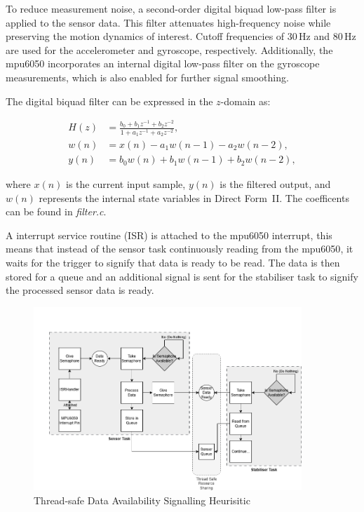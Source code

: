 To reduce measurement noise, a second-order digital biquad low-pass filter is applied to the sensor data. This filter attenuates high-frequency noise while preserving the motion dynamics of interest. Cutoff frequencies of 30\,Hz and 80\,Hz are used for the accelerometer and gyroscope, respectively. Additionally, the \gls{mpu6050} incorporates an internal digital low-pass filter on the gyroscope measurements, which is also enabled for further signal smoothing.

The digital biquad filter can be expressed in the $z$-domain as:

\begin{align}
H(z) &= \frac{b_0 + b_1 z^{-1} + b_2 z^{-2}}{1 + a_1 z^{-1} + a_2 z^{-2}}, \\[6pt]
w(n) &= x(n) - a_1 w(n-1) - a_2 w(n-2), \\[6pt]
y(n) &= b_0 w(n) + b_1 w(n-1) + b_2 w(n-2),
\end{align}

where \( x(n) \) is the current input sample, \( y(n) \) is the filtered output, and \( w(n) \) represents the internal state variables in Direct Form~II. The coefficents can be found in \textit{filter.c}.

A interrupt service routine (ISR) is attached to the \gls{mpu6050} interrupt, this means that instead of the sensor task continuously reading from the \gls{mpu6050}, it waits for the trigger to signify that data is ready to be read. The data is then stored for a queue and an additional signal is sent for the stabiliser task to signify the processed sensor data is ready.

\begin{figure}[H]
    \centering
    \captionsetup{justification=centering, margin=1cm}
    \includegraphics[width=0.9\textwidth]{img/sensor-semaphore.PNG}
    \caption{Thread-safe Data Availability Signalling Heurisitic}
    \label{fig:arch-process}
\end{figure}

